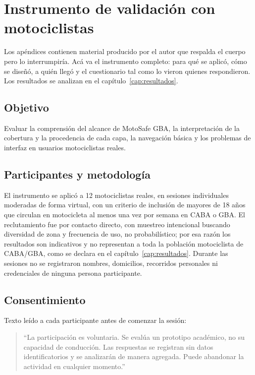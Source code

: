 
\chapter{Instrumento de validación con motociclistas}\label{apx:encuesta}

\begin{guia}
Los apéndices contienen material producido por el autor que respalda
el cuerpo pero lo interrumpiría. Acá va el instrumento completo: para
qué se aplicó, cómo se diseñó, a quién llegó y el cuestionario tal como
lo vieron quienes respondieron. Los resultados se analizan en el
capítulo~\ref{cap:resultados}.
\end{guia}

\section{Objetivo}

Evaluar la comprensión del alcance de MotoSafe GBA, la interpretación
de la cobertura y la procedencia de cada capa, la navegación básica y
los problemas de interfaz en usuarios motociclistas reales.

\section{Participantes y metodología}

El instrumento se aplicó a 12 motociclistas reales, en sesiones
individuales moderadas de forma virtual, con un criterio de inclusión
de mayores de 18 años que circulan en motocicleta al menos una vez por
semana en CABA o GBA. El reclutamiento fue por contacto directo, con
muestreo intencional buscando diversidad de zona y frecuencia de uso,
no probabilístico; por esa razón los resultados son indicativos y no
representan a toda la población motociclista de CABA/GBA, como se
declara en el capítulo~\ref{cap:resultados}. Durante las sesiones no se
registraron nombres, domicilios, recorridos personales ni credenciales
de ninguna persona participante.

\section{Consentimiento}

Texto leído a cada participante antes de comenzar la sesión:

\begin{quote}
``La participación es voluntaria. Se evalúa un prototipo académico, no
su capacidad de conducción. Las respuestas se registran sin datos
identificatorios y se analizarán de manera agregada. Puede abandonar la
actividad en cualquier momento.''
\end{quote}

